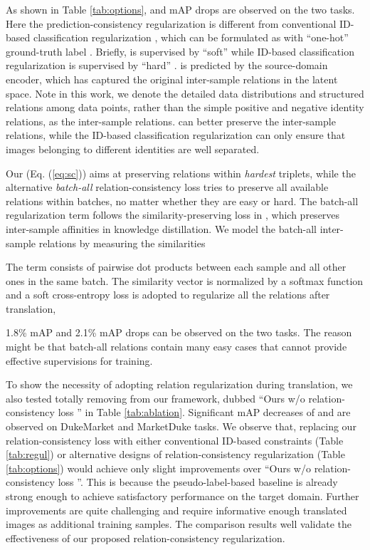 \documentclass[journal]{IEEEtran}
\begin{document}
As shown in Table \ref{tab:options},
 and  mAP drops are observed on the two tasks.
 {Here the prediction-consistency regularization  is different from conventional ID-based classification regularization \cite{deng2018similarity,chen2019instance,zou2020joint}, which can be formulated as  with ``one-hot'' ground-truth label .   Briefly,  is supervised by ``soft''  while ID-based classification regularization is supervised by ``hard'' .  is predicted by the source-domain encoder, which has captured the original inter-sample relations in the latent space. Note in this work, we denote the detailed data distributions and structured relations among data points, rather than the simple positive and negative identity relations, as the inter-sample relations.   can better preserve the inter-sample relations, while the ID-based classification regularization can only ensure that images belonging to different identities are well separated.}

Our  (Eq. (\ref{eq:sc})) aims at preserving relations within \textit{hardest} triplets,
while the alternative \textit{batch-all} relation-consistency loss   tries to preserve all available relations within batches, no matter whether they are easy or hard.
 {The batch-all regularization term follows the similarity-preserving loss in \cite{tung2019similarity}, which preserves inter-sample affinities in knowledge distillation.}
We model the batch-all inter-sample relations by measuring
the similarities

The term consists of pairwise dot products between each sample  and all other ones in the same batch.
The similarity vector is normalized by a softmax function and a soft cross-entropy loss is adopted to regularize all the relations after translation,

1.8\% mAP and 2.1\% mAP drops can be observed on the two tasks.
The reason might be that
batch-all relations contain many easy cases that cannot provide effective supervisions for training.


To show the necessity of adopting relation regularization during translation, we also tested totally removing  from our framework, dubbed ``Ours w/o relation-consistency loss '' in Table \ref{tab:ablation}.
Significant mAP decreases of  and  are observed on DukeMarket and MarketDuke tasks.
 {We observe that,  replacing our relation-consistency loss  with either conventional ID-based constraints (Table \ref{tab:regul}) or alternative designs of relation-consistency regularization (Table \ref{tab:options}) would achieve only slight improvements over ``Ours w/o relation-consistency loss ''.  This is because the pseudo-label-based baseline is already strong enough to achieve satisfactory performance on the target domain. Further improvements are quite
challenging and require informative enough translated images as additional training samples. The comparison results well validate the effectiveness of our proposed relation-consistency regularization.}
\end{document}

